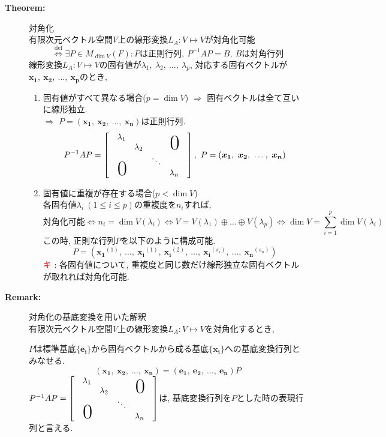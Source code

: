 \documentclass[dvipdfmx]{jsarticle}
\newcommand*{\point}{\textcircled{\textcolor{red}{\scriptsize キ}} }
\newcommand{\defEq}{\overset{\mathrm{def}}{\Leftrightarrow}}
\def\hsymb#1{\mbox{\strut\rlap{\smash{\Huge$#1$}}\quad}}
\begin{document}
\begin{description}
    \item[\bf{Theorem:}] 対角化 \\
        有限次元ベクトル空間$V$上の線形変換$L_A : V \mapsto V$が対角化可能
            $$ \defEq \exists P \in M_{\dim V}(F): P\text{は正則行列},\ P^{-1} A P = B,\ B \text{は対角行列} $$ 
        線形変換$L_A : V \mapsto V$の固有値が$\lambda_1,\ \lambda_2,\ \dots,\ \lambda_p$, 対応する固有ベクトルが$\bm{x_1},\ \bm{x_2},\ \dots,\ \bm{x_p}$のとき, 
        \begin{enumerate}
            \item 固有値がすべて異なる場合($p=\dim V$) $\Rightarrow$ 固有ベクトルは全て互いに線形独立. \\
            $\Rightarrow$ $P = ( \bm{x_1},\ \bm{x_2},\ \dots,\ \bm{x_n} )$は正則行列.
            $$ P^{-1} A P = \begin{bmatrix}
                & \lambda_1 &           &    &  & \\
                &          & \lambda_2 &     & \hsymb{0} &  \\
                &         &           & \ddots &  \\
                &\hsymb{0} & & & \lambda_n \\
                \end{bmatrix}
            ,\ P = ( \bm{x_1},\ \bm{x_2},\ \dots,\ \bm{x_n} ) $$
        
            \item 固有値に重複が存在する場合($p < \dim V$) \\
                各固有値$\lambda_i \ ( 1\leq i \leq p )$の重複度を$n_i$すれば, 
                $$ \text{対角化可能} \Leftrightarrow n_i = \dim V(\lambda_i) \Leftrightarrow V = V(\lambda_1) \oplus \dots \oplus V(\lambda_p) \Leftrightarrow \dim V = \sum_{i=1}^p \dim V(\lambda_i)$$
                この時, 正則な行列$P$を以下のように構成可能.
                $$P = ( \bm{x_1}^{(1)},\ \dots,\ \bm{x_i}^{(1)},\ \bm{x_i}^{(2)},\ \dots,\ \bm{x_i}^{(s_i)},\ \dots ,\ \bm{x_n}^{(s_n)} )$$
                \point : 各固有値について, 重複度と同じ数だけ線形独立な固有ベクトルが取れれば対角化可能.
        \end{enumerate}

    \item[\bf{Remark:}] 対角化の基底変換を用いた解釈 \\
    有限次元ベクトル空間$V$上の線形変換$L_A : V \mapsto V$を対角化するとき, 

    $P$は標準基底$\{ \bm{e_i} \}$から固有ベクトルから成る基底$\{ \bm{x_i} \}$への基底変換行列とみなせる.
    $$ ( \bm{x_1},\ \bm{x_2},\ \dots ,\ \bm{x_n} ) = ( \bm{e_1},\ \bm{e_2},\ \dots ,\ \bm{e_n} )P $$
    $P^{-1}AP = \begin{bmatrix}
        & \lambda_1 &           &    &  & \\
        &          & \lambda_2 &     & \hsymb{0} &  \\
        &         &           & \ddots &  \\
        &\hsymb{0} & & & \lambda_n \\
        \end{bmatrix}$は, 基底変換行列を$P$とした時の表現行列と言える.
\end{description}
\end{document}
